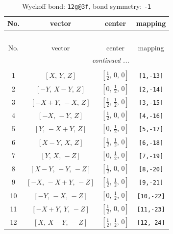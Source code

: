 \documentclass[fleqn,8pt]{jsarticle}
\begin{document}
\begin{longtable}{cccc}
\caption{Wyckoff bond: {\tt 12g@3f}, bond symmetry: {\tt -1}}
 \\
 \hline \hline
No. & vector & center & mapping \\ \hline \endfirsthead

\multicolumn{3}{l}{\tablename\ \thetable{}} \\
 \hline \hline
No. & vector & center & mapping \\ \hline \endhead

 \hline \hline
\multicolumn{3}{r}{\footnotesize\it continued ...} \\ \endfoot

 \hline \hline
\multicolumn{3}{r}{} \\ \endlastfoot

1 & $\left[ X,\, Y,\, Z \right]$ & $\left[ \frac{1}{2},\, 0,\, 0 \right]$ & {\tt [1,-13]} \\ \hline
2 & $\left[ - Y,\, X - Y,\, Z \right]$ & $\left[ 0,\, \frac{1}{2},\, 0 \right]$ & {\tt [2,-14]} \\ \hline
3 & $\left[ - X + Y,\, - X,\, Z \right]$ & $\left[ \frac{1}{2},\, \frac{1}{2},\, 0 \right]$ & {\tt [3,-15]} \\ \hline
4 & $\left[ - X,\, - Y,\, Z \right]$ & $\left[ \frac{1}{2},\, 0,\, 0 \right]$ & {\tt [4,-16]} \\ \hline
5 & $\left[ Y,\, - X + Y,\, Z \right]$ & $\left[ 0,\, \frac{1}{2},\, 0 \right]$ & {\tt [5,-17]} \\ \hline
6 & $\left[ X - Y,\, X,\, Z \right]$ & $\left[ \frac{1}{2},\, \frac{1}{2},\, 0 \right]$ & {\tt [6,-18]} \\ \hline
7 & $\left[ Y,\, X,\, - Z \right]$ & $\left[ 0,\, \frac{1}{2},\, 0 \right]$ & {\tt [7,-19]} \\ \hline
8 & $\left[ X - Y,\, - Y,\, - Z \right]$ & $\left[ \frac{1}{2},\, 0,\, 0 \right]$ & {\tt [8,-20]} \\ \hline
9 & $\left[ - X,\, - X + Y,\, - Z \right]$ & $\left[ \frac{1}{2},\, \frac{1}{2},\, 0 \right]$ & {\tt [9,-21]} \\ \hline
10 & $\left[ - Y,\, - X,\, - Z \right]$ & $\left[ 0,\, \frac{1}{2},\, 0 \right]$ & {\tt [10,-22]} \\ \hline
11 & $\left[ - X + Y,\, Y,\, - Z \right]$ & $\left[ \frac{1}{2},\, 0,\, 0 \right]$ & {\tt [11,-23]} \\ \hline
12 & $\left[ X,\, X - Y,\, - Z \right]$ & $\left[ \frac{1}{2},\, \frac{1}{2},\, 0 \right]$ & {\tt [12,-24]} \\
\end{longtable}
\end{document}
